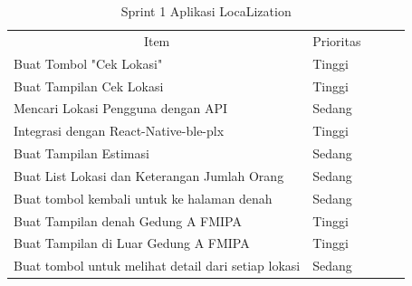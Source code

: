 \begin{enumerate}[1.]
	      \begin{table}[H]
		      \centering
		      \caption{Sprint 1 Aplikasi LocaLization}
		      \label{LocaLization-sprint-1}
		      \begin{tabular}{lllll}
			      \cline{1-2}
			      \multicolumn{1}{|c|}{\cellcolor[HTML]{CBCEFB}Item}                        & \multicolumn{1}{c|}{\cellcolor[HTML]{CBCEFB}Prioritas} &  &  & \\ \cline{1-2}
			      \multicolumn{1}{|l|}{Buat Tombol "Cek Lokasi"}                            & \multicolumn{1}{l|}{Tinggi}                            &  &  & \\ \cline{1-2}
			      \multicolumn{1}{|l|}{Buat Tampilan Cek Lokasi}                            & \multicolumn{1}{l|}{Tinggi}                            &  &  & \\ \cline{1-2}
			      \multicolumn{1}{|l|}{Mencari Lokasi Pengguna dengan API}                  & \multicolumn{1}{l|}{Sedang}                            &  &  & \\ \cline{1-2}
			      \multicolumn{1}{|l|}{Integrasi dengan React-Native-ble-plx}               & \multicolumn{1}{l|}{Tinggi}                            &  &  & \\ \cline{1-2}
			      \multicolumn{1}{|l|}{Buat Tampilan Estimasi}                              & \multicolumn{1}{l|}{Sedang}                            &  &  & \\ \cline{1-2}
			      \multicolumn{1}{|l|}{Buat List Lokasi dan Keterangan Jumlah Orang}        & \multicolumn{1}{l|}{Sedang}                            &  &  & \\ \cline{1-2}
			      \multicolumn{1}{|l|}{Buat tombol kembali untuk ke halaman denah}          & \multicolumn{1}{l|}{Sedang}                            &  &  & \\ \cline{1-2}
			      \multicolumn{1}{|l|}{Buat Tampilan denah Gedung A FMIPA}                  & \multicolumn{1}{l|}{Tinggi}                            &  &  & \\ \cline{1-2}
			      \multicolumn{1}{|l|}{Buat Tampilan di Luar Gedung A FMIPA}                & \multicolumn{1}{l|}{Tinggi}                            &  &  & \\ \cline{1-2}
			      \multicolumn{1}{|l|}{Buat tombol untuk melihat detail dari setiap lokasi} & \multicolumn{1}{l|}{Sedang}                            &  &  & \\ \cline{1-2}
		      \end{tabular}
	      \end{table}


\end{enumerate}
